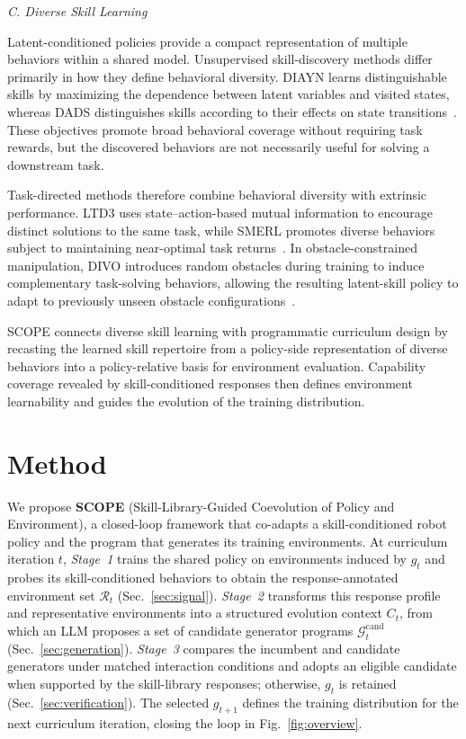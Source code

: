 \documentclass[conference]{IEEEtran}
\begin{document}
\textit{C. Diverse Skill Learning}

Latent-conditioned policies provide a compact representation of multiple
behaviors within a shared model. Unsupervised skill-discovery methods differ
primarily in how they define behavioral diversity. DIAYN learns distinguishable
skills by maximizing the dependence between latent variables and visited
states, whereas DADS distinguishes skills according to their effects on state
transitions~\cite{diayn,dads}. These objectives promote broad behavioral
coverage without requiring task rewards, but the discovered behaviors are not
necessarily useful for solving a downstream task.

Task-directed methods therefore combine behavioral diversity with extrinsic
performance. LTD3 uses state--action-based mutual information to encourage
distinct solutions to the same task, while SMERL promotes diverse behaviors
subject to maintaining near-optimal task returns~\cite{ltd3,smerl}. In
obstacle-constrained manipulation, DIVO introduces random obstacles during
training to induce complementary task-solving behaviors, allowing the resulting
latent-skill policy to adapt to previously unseen obstacle
configurations~\cite{divo}.

SCOPE connects diverse skill learning with programmatic curriculum design by
recasting the learned skill repertoire from a policy-side representation of
diverse behaviors into a policy-relative basis for environment evaluation.
Capability coverage revealed by skill-conditioned responses then defines
environment learnability and guides the evolution of the training distribution.

\section{Method}
\label{sec:method}
We propose \textbf{SCOPE} (Skill-Library-Guided Coevolution of Policy and
Environment), a closed-loop framework that co-adapts a skill-conditioned robot
policy and the program that generates its training environments. At curriculum
iteration $t$, \emph{Stage~1} trains the shared policy on environments induced by
$g_t$ and probes its skill-conditioned behaviors to obtain the
response-annotated environment set $\mathcal R_t$ (Sec.~\ref{sec:signal}).
\emph{Stage~2} transforms this response profile and representative environments
into a structured evolution context $C_t$, from which an LLM proposes a set of
candidate generator programs $\mathcal G_t^{\mathrm{cand}}$
(Sec.~\ref{sec:generation}). \emph{Stage~3} compares the incumbent and candidate
generators under matched interaction conditions and adopts an eligible candidate
when supported by the skill-library responses; otherwise, $g_t$ is retained
(Sec.~\ref{sec:verification}). The selected $g_{t+1}$ defines the training
distribution for the next curriculum iteration, closing the loop in
Fig.~\ref{fig:overview}.
\end{document}
